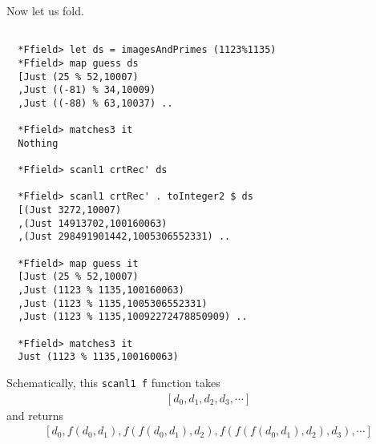 \documentclass[11pt]{book}
\begin{document}
Now let us fold.
\begin{verbatim}

  *Ffield> let ds = imagesAndPrimes (1123%1135)
  *Ffield> map guess ds
  [Just (25 % 52,10007)
  ,Just ((-81) % 34,10009)
  ,Just ((-88) % 63,10037) ..

  *Ffield> matches3 it
  Nothing

  *Ffield> scanl1 crtRec' ds

  *Ffield> scanl1 crtRec' . toInteger2 $ ds
  [(Just 3272,10007)
  ,(Just 14913702,100160063)
  ,(Just 298491901442,1005306552331) ..

  *Ffield> map guess it
  [Just (25 % 52,10007)
  ,Just (1123 % 1135,100160063)
  ,Just (1123 % 1135,1005306552331)
  ,Just (1123 % 1135,10092272478850909) ..

  *Ffield> matches3 it
  Just (1123 % 1135,100160063)

\end{verbatim}
Schematically, this \texttt{scanl1 f} function takes
\begin{eqnarray}
\left[d_0, d_1, d_2, d_3, \cdots \right]
\end{eqnarray}
and returns
\begin{eqnarray}
\left[d_0, f(d_0,d_1), f(f(d_0,d_1),d_2), f(f(f(d_0,d_1),d_2), d_3), \cdots \right]
\end{eqnarray}
%
\end{document}
